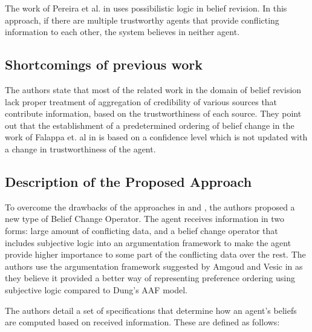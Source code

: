 \documentclass[UTF8]{article}
\begin{document}
The work of Pereira et al. in \cite{Pereira} uses possibilistic logic in belief revision. In this approach, if there are multiple 
trustworthy agents that provide conflicting information to each other, the system believes in neither agent.

\subsection{Shortcomings of previous work}
The authors state that most of the related work in the domain of belief revision lack proper treatment of aggregation of credibility 
of various sources that contribute information, based on the trustworthiness of each source. They point out that the establishment of a 
predetermined ordering of belief change in 
the work of Falappa et. al in \cite{Falappa} is based on a confidence level which is not updated with a change in trustworthiness of the agent.

\subsection{Description of the Proposed Approach}
To overcome the drawbacks of the approaches in \cite{Falappa} and \cite{Tang2012UsingAT}, the authors proposed a new type of Belief Change Operator. 
The agent receives information in two forms: large amount of conflicting data, and a belief change operator that includes subjective logic
into an argumentation framework to make the agent provide higher importance to some part of the conflicting data over the rest. The authors use 
the argumentation framework suggested by Amgoud and Vesic in \cite{AMGOUD2014585} as they believe it provided a better way of representing preference
ordering using subjective logic compared to Dung's \cite{DUNG1995321} AAF model.

The authors detail a set of specifications that determine how an agent's beliefs are computed based on received information. These are defined as follows:
\end{document}
